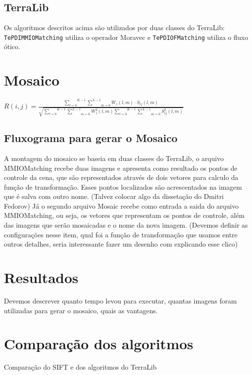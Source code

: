 \documentclass[9pt, a4paper, nofonttune, journal]{IEEEtran}
\begin{document}
\subsection{TerraLib}
Os algoritmos descritos acima são utilizados por duas classes do TerraLib: \texttt{TePDIMMIOMatching} utiliza o operador Moravec e \texttt{TePDIOFMatching} utiliza o fluxo ótico.
\section{Mosaico}

\cite{Leila1}\cite{Zhao1}
\begin{center}
$R(i,j)=\frac{\overset{K-1}{\underset{l=0}{\sum}}\underset{m=0}{\overset{L-1}{\sum}}W_{z}(l,m)\cdot S_{ij}(l,m)}{\sqrt{\overset{K-1}{\underset{l=0}{\sum}}\underset{m=0}{\overset{L-1}{\sum}}W_{z}^{2}(l,m)\overset{K-1}{\underset{l=0}{\sum}}\underset{m=0}{\overset{L-1}{\sum}}S_{ij}^{2}(l,m)}}$\end{center}

\subsection{ Fluxograma para gerar o Mosaico}
 A montagem do mosaico se baseia em duas classes do TerraLib, o arquivo MMIOMatching recebe duas imagens e apresenta como resultado os pontos de controle da cena, que são representados através de dois vetores para calculo da função de transformação. Esses pontos localizados são acrescentados na imagem que é salva com outro nome.
(Talvez colocar algo da dissetação do Dmitri Fedorov)
 Já o segundo arquivo  Mosaic recebe como entrada  a saida do  arquivo MMIOMatching, ou seja, os vetores  que representam os pontos de controle, além das imagens que serão mosaicadas e o nome da nova imagem.
(Devemos definir as configurações nesse item, qual foi a função de transformação que usamos entre outros detalhes, seria interessante fazer um desenho com explicando esse clico)

\section{Resultados}
Devemos descrever quanto tempo levou para executar, quantas imagens foram utilizadas para gerar o mosaico, quais as vantagens. 

\section{Comparação dos algoritmos}
Comparação do SIFT e dos algoritmos do TerraLib
\end{document}
